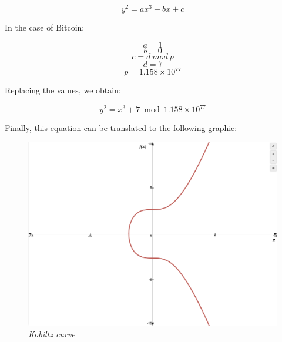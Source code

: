 \documentclass{article}
\begin{document}
\[y^2 = ax^3 + bx + c\]

In the case of Bitcoin:

\[a = 1\]
\[b = 0\]
\[c = d\: mod\: p\]
\[d = 7\]
\[p = 1.158 \times 10^{77}\]

Replacing the values, we obtain:

\[y^2 = x^3 + 7 \bmod{1.158 \times 10^{77}}\]

Finally, this equation can be translated to the following graphic:

\vspace{5mm} %

\begin{figure}[H]
    \begin{center}
        \includegraphics[width=0.6 \textwidth]{images/Kobiltz_curve.png}
        \caption{\textit{Kobiltz curve}}
    \end{center}
\end{figure}

\vspace{5mm} %

\end{document}

